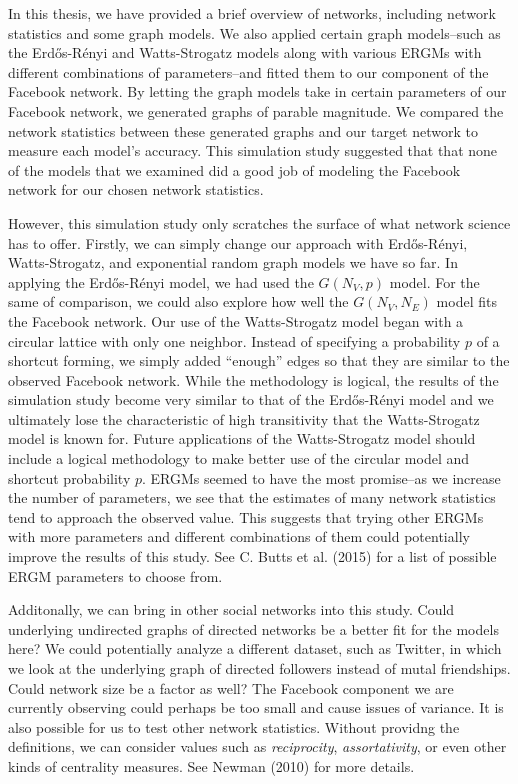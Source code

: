 \documentclass[12pt,twoside]{amherstthesis}
\begin{document}
  In this thesis, we have provided a brief overview of networks, including
  network statistics and some graph models. We also applied certain graph
  models--such as the Erdős-Rényi and Watts-Strogatz models along with
  various ERGMs with different combinations of parameters--and fitted them
  to our component of the Facebook network. By letting the graph models
  take in certain parameters of our Facebook network, we generated graphs
  of parable magnitude. We compared the network statistics between these
  generated graphs and our target network to measure each model's
  accuracy. This simulation study suggested that that none of the models
  that we examined did a good job of modeling the Facebook network for our
  chosen network statistics.
  
  However, this simulation study only scratches the surface of what
  network science has to offer. Firstly, we can simply change our approach
  with Erdős-Rényi, Watts-Strogatz, and exponential random graph models we
  have so far. In applying the Erdős-Rényi model, we had used the
  \(G(N_{V}, p)\) model. For the same of comparison, we could also explore
  how well the \(G(N_{V}, N_{E})\) model fits the Facebook network. Our
  use of the Watts-Strogatz model began with a circular lattice with only
  one neighbor. Instead of specifying a probability \(p\) of a shortcut
  forming, we simply added ``enough'' edges so that they are similar to
  the observed Facebook network. While the methodology is logical, the
  results of the simulation study become very similar to that of the
  Erdős-Rényi model and we ultimately lose the characteristic of high
  transitivity that the Watts-Strogatz model is known for. Future
  applications of the Watts-Strogatz model should include a logical
  methodology to make better use of the circular model and shortcut
  probability \(p\). ERGMs seemed to have the most promise--as we increase
  the number of parameters, we see that the estimates of many network
  statistics tend to approach the observed value. This suggests that
  trying other ERGMs with more parameters and different combinations of
  them could potentially improve the results of this study. See C. Butts
  et al. (2015) for a list of possible ERGM parameters to choose from.
  
  Additonally, we can bring in other social networks into this study.
  Could underlying undirected graphs of directed networks be a better fit
  for the models here? We could potentially analyze a different dataset,
  such as Twitter, in which we look at the underlying graph of directed
  followers instead of mutal friendships. Could network size be a factor
  as well? The Facebook component we are currently observing could perhaps
  be too small and cause issues of variance. It is also possible for us to
  test other network statistics. Without providng the definitions, we can
  consider values such as \emph{reciprocity}, \emph{assortativity}, or
  even other kinds of centrality measures. See Newman (2010) for more
  details.
  
\end{document}
